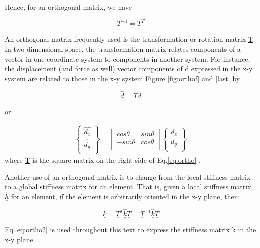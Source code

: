 \documentclass[12pt]{report}
\newcommand{\lab}[1]{
	Eq.\ref{#1}
}
\begin{document}
Hence, for an orthogonal matrix, we have

\begin{equation}
	\underline{T}^{-1}=\underline{T}^T
\end{equation}

An orthogonal matrix frequently used is the transformation or rotation
matrix \underline{T}. In two dimensional space, the transformation matrix
relates components of a vector in one coordinate system to components
in another system. For instance, the displacement (and force as well)
vector components of \underline{d} expressed in the x-y system are related to
those in the x-y system Figure \ref{fig:orthof} and \ref{last} by

\begin{equation}
	\hat{d}=\underline{T}\underline{d}
\end{equation}

or

\begin{eqnarray}
	\left\{\begin{array}{rr}
	\hat{d_{x}} \\
	\hat{d_{y}} \\
\end{array}\right\} = \left[\begin{array}{rr}
	cos\theta & sin\theta \\
	-sin\theta & cos\theta  \\
\end{array}\right]
	\left\{\begin{array}{rr}
	d_{x} \\
	d_{y} \\
\end{array}\right\}
	\label{eq:ortho}
\end{eqnarray}
where \underline{T} is the square matrix on the right side of \lab{eq:ortho}.


Another use of an orthogonal matrix is to change from the local
stiffness matrix to a global stiffness matrix for an element. That is,
given a local stiffness matrix $\hat{\underline{h}}$ for an element, if the
element is arbitrarily oriented in the x-y plane, then:

\begin{equation}
	\underline{k}=\underline{T}^T \hat{\underline{k}}\underline{T}=\underline{T}^{-1}\hat{\underline{k}}\underline{T}
	\label{eq:ortho2}
\end{equation}

\lab{eq:ortho2} is used throughout this text to express the
stiffness matrix \underline{k} in the x-y plane.
\end{document}

